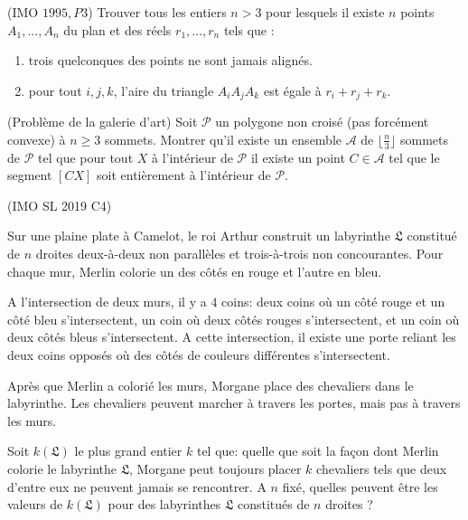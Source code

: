 \begin{exo}
(IMO $1995,P3$) Trouver tous les entiers $n > 3$ pour lesquels il existe $n$ points $A_1, ..., A_n$
du plan et des réels $r_1, ..., r_n$ tels que :
\begin{enumerate}
    \item trois quelconques des points ne sont jamais alignés.
    \item pour tout ${i, j, k}$, l’aire du triangle $A_iA_jA_k$ est égale à $r_i + r_j + r_k$.
\end{enumerate}
\end{exo}

\begin{exo}
(Problème de la galerie d’art) Soit $\mathcal{P}$ un polygone non croisé (pas forcément convexe) à $n\ge 3$ sommets. Montrer qu’il existe un ensemble $\mathcal{A}$ de $\lfloor\frac n3\rfloor$ sommets de $\mathcal{P}$ tel que pour tout $X$ à l’intérieur de $\mathcal{P}$ il existe un point $C\in\mathcal{A}$ tel que le segment $[CX]$ soit entièrement à l’intérieur de $\mathcal{P}$.
\end{exo}

\begin{exo}
(IMO SL 2019 C4)

Sur une plaine plate à Camelot, le roi Arthur construit un labyrinthe $\mathfrak{L}$ constitué de $n$ droites deux-à-deux non parallèles et trois-à-trois non concourantes. Pour chaque mur, Merlin colorie un des côtés en rouge et l'autre en bleu.

A l'intersection de deux murs, il y a $4$ coins: deux coins où un côté rouge et un côté bleu s'intersectent, un coin où deux côtés rouges s'intersectent, et un coin où deux côtés bleus s'intersectent. A cette intersection, il existe une porte reliant les deux coins opposés où des côtés de couleurs différentes s'intersectent.

Après que Merlin a colorié les murs, Morgane place des chevaliers dans le labyrinthe. Les chevaliers peuvent marcher à travers les portes, mais pas à travers les murs.

Soit $k(\mathfrak{L})$ le plus grand entier $k$ tel que: quelle que soit la façon dont Merlin colorie le labyrinthe $\mathfrak{L}$, Morgane peut toujours placer $k$ chevaliers tels que deux d'entre eux ne peuvent jamais se rencontrer. A $n$ fixé, quelles peuvent être les valeurs de $k(\mathfrak{L})$ pour des labyrinthes $\mathfrak{L}$ constitués de $n$ droites ?
\end{exo}

